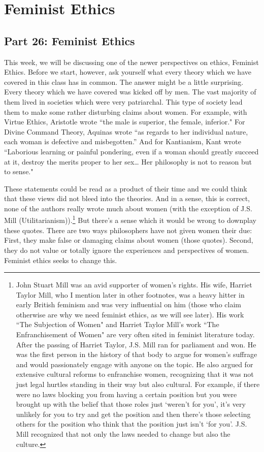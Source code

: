 \part{Feminist Ethics}
\label{ch.mod9}
\chapter{Part 26: Feminist Ethics}

This week, we will be discussing one of the newer perspectives on ethics, Feminist Ethics. Before we start, however, ask yourself what every theory which we have covered in this class has in common. The answer might be a little surprising. Every theory which we have covered was kicked off by men. The vast majority of them lived in societies which were very patriarchal. This type of society lead them to make some rather disturbing claims about women. For example, with Virtue Ethics, Aristotle wrote ``the male is superior, the female, inferior." For Divine Command Theory, Aquinas wrote “as regards to her individual nature, each woman is defective and misbegotten.” And for Kantianism, Kant wrote ``Laborious learning or painful pondering, even if a woman should greatly succeed at it, destroy the merits proper to her sex… Her philosophy is not to reason but to sense."

These statements could be read as a product of their time and we could think that these views did not bleed into the theories. And in a sense, this is correct, none of the authors really wrote much about women (with the exception of J.S. Mill (Utilitarianism)).\footnote{John Stuart Mill was an avid supporter of women's rights. His wife, Harriet Taylor Mill, who I mention later in other footnotes, was a heavy hitter in early British feminism and was very influential on him (those who claim otherwise are why we need feminist ethics, as we will see later). His work ``The Subjection of Women" and Harriet Taylor Mill's work ``The Enfranchisement of Women" are very often sited in feminist literature today. After the passing of Harriet Taylor, J.S. Mill ran for parliament and won. He was the first person in the history of that body to argue for women's suffrage and would passionately engage with anyone on the topic. He also argued for extensive cultural reforms to enfranchise women, recognizing that it was not just legal hurtles standing in their way but also cultural. For example, if there were no laws blocking you from having a certain position but you were brought up with the belief that those roles just `weren't for you', it's very unlikely for you to try and get the position and then there's those selecting others for the position who think that the position just isn't `for you'. J.S. Mill recognized that not only the laws needed to change but also the culture.} But there’s a sense which it would be wrong to downplay these quotes. There are two ways philosophers have not given women their due: First, they make false or damaging claims about women (those quotes). Second, they do not value or totally ignore the experiences and perspectives of women. Feminist ethics seeks to change this.


